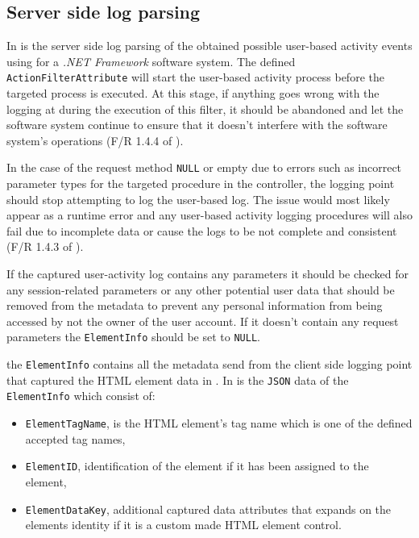 \subsection{Server side log parsing}
In  is the server side log parsing of the obtained possible user-based activity events using for a \emph{.NET Framework} software system. The defined \texttt{ActionFilterAttribute} will start the user-based activity process before the targeted process is executed. At this stage, if anything goes wrong with the logging at during the execution of this filter, it should be abandoned and let the software system continue to ensure that it doesn't interfere with the software system's operations (F/R 1.4.4 of ).\par In the case of the request method \texttt{NULL} or empty due to errors such as incorrect parameter types for the targeted procedure in the controller, the logging point should stop attempting to log the user-based log. The issue would most likely appear as a runtime error and any user-based activity logging procedures will also fail due to incomplete data or cause the logs to be not complete and consistent (F/R 1.4.3 of ).\par If the captured user-activity log contains any parameters it should be checked for any session-related parameters or any other potential user data that should be removed from the metadata to prevent any personal information from being accessed by not the owner of the user account. If it doesn't contain any request parameters the \texttt{ElementInfo} should be set to \texttt{NULL}.\par the \texttt{ElementInfo} contains all the metadata send from the client side logging point that captured the HTML element data in . In  is the \texttt{JSON} data of the \texttt{ElementInfo} which consist of:

\begin{itemize}
	\item \texttt{ElementTagName}, is the HTML element's tag name which is one of the defined accepted tag names,
	\item \texttt{ElementID}, identification of the element if it has been assigned to the element,
	\item \texttt{ElementDataKey}, additional captured data attributes that expands on the elements identity if it is a custom made HTML element control.
\end{itemize}

